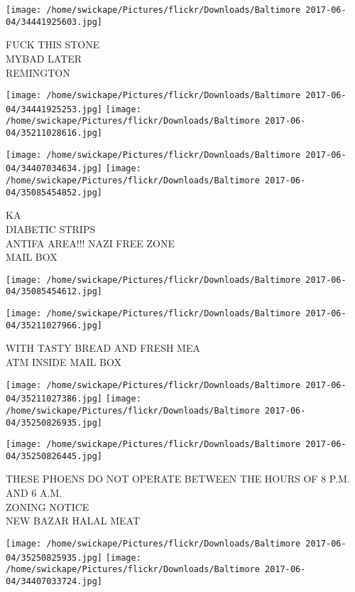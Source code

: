 \documentclass[10pt,letterpaper]{article}
\begin{document}
\vspace{0.25in}
\texttt{[image: /home/swickape/Pictures/flickr/Downloads/Baltimore 2017-06-04/34441925603.jpg]}

FUCK THIS STONE\\
MYBAD LATER\\
REMINGTON
\pagebreak

\texttt{[image: /home/swickape/Pictures/flickr/Downloads/Baltimore 2017-06-04/34441925253.jpg]}
\texttt{[image: /home/swickape/Pictures/flickr/Downloads/Baltimore 2017-06-04/35211028616.jpg]}

\texttt{[image: /home/swickape/Pictures/flickr/Downloads/Baltimore 2017-06-04/34407034634.jpg]}
\texttt{[image: /home/swickape/Pictures/flickr/Downloads/Baltimore 2017-06-04/35085454852.jpg]}

KA\\
DIABETIC STRIPS\\
ANTIFA AREA!!! NAZI FREE ZONE\\
MAIL BOX
\pagebreak

\texttt{[image: /home/swickape/Pictures/flickr/Downloads/Baltimore 2017-06-04/35085454612.jpg]}

\vspace{0.25in}
\texttt{[image: /home/swickape/Pictures/flickr/Downloads/Baltimore 2017-06-04/35211027966.jpg]}

WITH TASTY BREAD AND FRESH MEA\\
ATM INSIDE MAIL BOX
\pagebreak

\texttt{[image: /home/swickape/Pictures/flickr/Downloads/Baltimore 2017-06-04/35211027386.jpg]}
\texttt{[image: /home/swickape/Pictures/flickr/Downloads/Baltimore 2017-06-04/35250826935.jpg]}

\vspace{0.25in}
\texttt{[image: /home/swickape/Pictures/flickr/Downloads/Baltimore 2017-06-04/35250826445.jpg]}

THESE PHOENS DO NOT OPERATE BETWEEN THE HOURS OF 8 P.M. AND 6 A.M.\\
ZONING NOTICE\\
NEW BAZAR HALAL MEAT
\pagebreak

\texttt{[image: /home/swickape/Pictures/flickr/Downloads/Baltimore 2017-06-04/35250825935.jpg]}
\texttt{[image: /home/swickape/Pictures/flickr/Downloads/Baltimore 2017-06-04/34407033724.jpg]}
\end{document}
